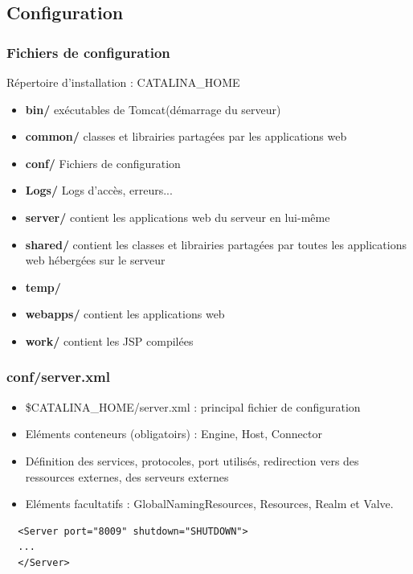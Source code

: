 \subsection{Configuration}
\begin{frame}
  \frametitle{Fichiers de configuration}

		Répertoire d'installation : CATALINA\_HOME
\begin{itemize} 
    \item \textbf{bin/} exécutables de Tomcat(démarrage du serveur)
    \item \textbf{common/} classes et librairies partagées par les applications web
    \item \textbf{conf/} Fichiers de configuration
    \item \textbf{Logs/} Logs d'accès, erreurs...
    \item \textbf{server/} contient les applications web du serveur en lui-même
    \item \textbf{shared/} contient les classes et librairies partagées par toutes les applications web hébergées sur le serveur
    \item \textbf{temp/}
    \item \textbf{webapps/} contient les applications web
    \item \textbf{work/} contient les JSP compilées
\end{itemize} 
\end{frame}


\begin{frame}[fragile]
  \frametitle{conf/server.xml}

\begin{itemize}
  \item \$CATALINA\_HOME/server.xml : principal fichier de configuration
  \item Eléments conteneurs (obligatoirs) : Engine, Host, Connector
  \item Définition des services, protocoles, port utilisés, redirection vers des ressources externes, des serveurs externes
  \item Eléments facultatifs : GlobalNamingResources, Resources, Realm et Valve.
\end{itemize} 

\begin{lstlisting}
  <Server port="8009" shutdown="SHUTDOWN">
  ...
  </Server>
\end{lstlisting}
		
\end{frame}


